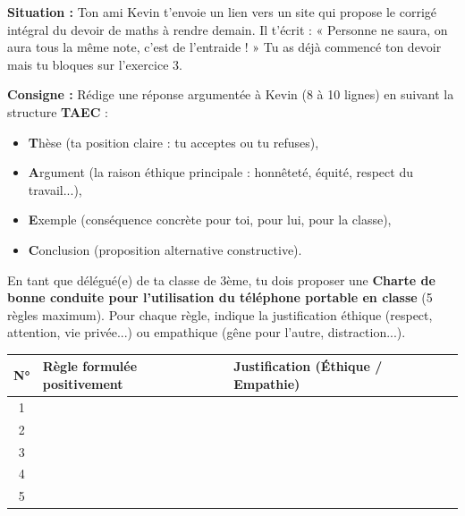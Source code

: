 \documentclass[11pt]{article}
\begin{document}
\begin{exercice}
\textbf{Situation :} Ton ami Kevin t'envoie un lien vers un site qui propose le corrigé intégral du devoir de maths à rendre demain. Il t'écrit : « Personne ne saura, on aura tous la même note, c'est de l'entraide ! » Tu as déjà commencé ton devoir mais tu bloques sur l'exercice 3.

\textbf{Consigne :} Rédige une réponse argumentée à Kevin (8 à 10 lignes) en suivant la structure \textbf{TAEC} :
\begin{itemize}
\item \textbf{T}hèse (ta position claire : tu acceptes ou tu refuses),
\item \textbf{A}rgument (la raison éthique principale : honnêteté, équité, respect du travail...),
\item \textbf{E}xemple (conséquence concrète pour toi, pour lui, pour la classe),
\item \textbf{C}onclusion (proposition alternative constructive).
\end{itemize}
\end{exercice}

\begin{exercice}
En tant que délégué(e) de ta classe de 3ème, tu dois proposer une \textbf{Charte de bonne conduite pour l'utilisation du téléphone portable en classe} (5 règles maximum). Pour chaque règle, indique la justification éthique (respect, attention, vie privée...) ou empathique (gêne pour l'autre, distraction...).

\begin{center}
\begin{tabularx}{\linewidth}{|c|X|X|}\hline
\rowcolor{popblueL}\textbf{N°} & \textbf{Règle formulée positivement} & \textbf{Justification (Éthique / Empathie)} \\\hline
1 & & \\\hline
2 & & \\\hline
3 & & \\\hline
4 & & \\\hline
5 & & \\\hline
\end{tabularx}
\end{center}
\end{exercice}
\end{document}
